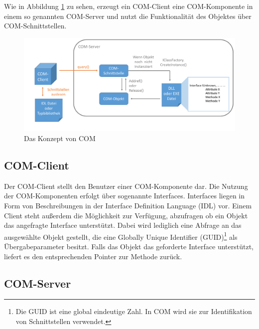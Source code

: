 Wie in Abbildung \ref{GL_COM} zu sehen, erzeugt ein COM-Client eine COM-Komponente in einem so genannten COM-Server und nutzt die Funktionalität des Objektes über COM-Schnittstellen. 

\begin{figure}[htbp]
	\centering
  \includegraphics[width=1.0\textwidth, width=1.0\textwidth]{pics/Grundlagen_com.pdf}
	\caption{Das Konzept von COM}
	\label{GL_COM}
\end{figure} 

\subsection{COM-Client}
\label{ch:grundlagen:sec:ComponentObjectModel:subsec:COMClient}

Der COM-Client stellt den Benutzer einer COM-Komponente dar. Die Nutzung der COM-Komponenten erfolgt über sogenannte Interfaces. Interfaces liegen in Form von Beschreibungen in der Interface Definition Language (IDL) vor. Einem Client steht außerdem die Möglichkeit zur Verfügung, abzufragen ob ein Objekt das angefragte Interface unterstützt. Dabei wird lediglich eine Abfrage an das ausgewählte Objekt gestellt, die eine Globally Unique Identifier (GUID)\footnote{Die GUID ist eine global eindeutige Zahl. In COM wird sie zur Identifikation von Schnittstellen verwendet.}  als Übergabeparameter besitzt. Falls das Objekt das geforderte Interface unterstützt, liefert es den entsprechenden Pointer zur Methode zurück.  

\subsection{COM-Server}
\label{ch:grundlagen:sec:ComponentObjectModel:subsec:COMServer}

